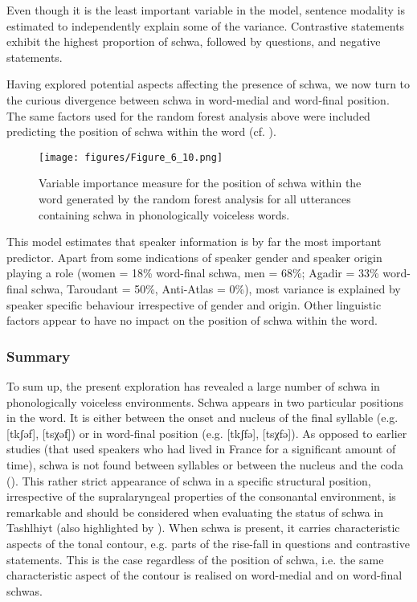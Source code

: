 Even though it is the least important variable in the model, sentence modality is estimated to independently explain some of the variance. Contrastive statements exhibit the highest proportion of schwa, followed by questions, and negative statements. 

Having explored potential aspects affecting the presence of schwa, we now turn to the curious divergence between schwa in word-medial and word-final position. The same factors used for the random forest analysis above were included predicting the position of schwa within the word (cf. ). 

  \begin{figure}
   \texttt{[image: figures/Figure\_6\_10.png]}
  \caption{Variable importance measure for the position of schwa within the word generated by the random forest analysis for all utterances containing schwa in phonologically voiceless words.}
   \label{fig:6.10}
   \end{figure}

This model estimates that speaker information is by far the most important predictor. Apart from some indications of speaker gender and speaker origin playing a role (women = 18\% word-final schwa, men = 68\%; Agadir = 33\% word-final schwa, Taroudant = 50\%, Anti-Atlas = 0\%), most variance is explained by speaker specific behaviour irrespective of gender and origin. Other linguistic factors appear to have no impact on the position of schwa within the word.

\subsubsection{Summary}
To sum up, the present exploration has revealed a large number of schwa in phonologically voiceless environments. Schwa appears in two particular positions in the word. It is either between the onset and nucleus of the final syllable (e.g. [tkʃəf], [tsχəf̩]) or in word-final position (e.g. [tkʃfə], [tsχfə]). As opposed to earlier studies (that used speakers who had lived in France for a significant amount of time), schwa is not found between syllables or between the nucleus and the coda (\citealt{Grice.etal2011,Grice.etal2015tash}). This rather strict appearance of schwa in a specific structural position, irrespective of the supralaryngeal properties of the consonantal environment, is remarkable and should be considered when evaluating the status of schwa in Tashlhiyt (also highlighted by \citealt{GordonNafi2012}). When schwa is present, it carries characteristic aspects of the tonal contour, e.g. parts of the rise-fall in questions and contrastive statements. This is the case regardless of the position of schwa, i.e. the same characteristic aspect of the contour is realised on word-medial and on word-final schwas. 

